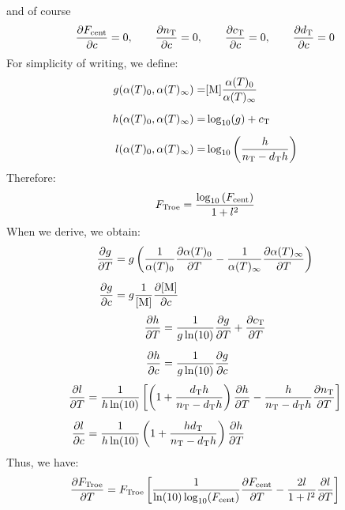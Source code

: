 and of course
\begin{equation}
\doverdc{\TroeFcent}  = 0,\qquad
\doverdc{\Troen}      = 0,\qquad
\doverdc{\Troec}      = 0,\qquad
\doverdc{\Troed}      = 0
\label{Troe:dparameterdc}
\end{equation}
For simplicity of writing, we define:
\begin{equation}
\begin{split}
g(\kinMod_0,\kinMod_\infty) = & \conc[M] \frac{\kinMod_0}{\kinMod_\infty} \\[5pt]
h(\kinMod_0,\kinMod_\infty) = & \log_{10}(g) + \Troec \\[5pt]
l(\kinMod_0,\kinMod_\infty) = & \log_{10}\left(\frac{h}{\Troen - \Troed h}\right) \\
\end{split}
\end{equation}
Therefore:
\begin{equation}
F_\text{Troe} = \frac{\log_{10}\left(F_\text{cent}\right)}{1 + l^2}
\end{equation}
When we derive, we obtain:
\begin{equation}
\begin{split}
\doverdT{g} & = g \left(\frac{1}{\kinMod_0}\doverdT{\kinMod_0} - \frac{1}{\kinMod_\infty}\doverdT{\kinMod_\infty} \right) \\[5pt]
\doverdc{g} & = g \frac{1}{\conc[M]}\doverdc{\conc[M]}
\end{split}
\end{equation}
\begin{equation}
\begin{split}
\doverdT{h} & = \frac{1}{g \ln(10)}\doverdT{g} + \doverdT{\Troec} \\[5pt]
\doverdc{h} & = \frac{1}{g\ln(10)}\doverdc{g}
\end{split}
\end{equation}
\begin{equation}
\begin{split}
\doverdT{l} & = \frac{1}{h \ln(10)}\left[\left(1 + \frac{\Troed h}{\Troen - \Troed h}\right) \doverdT{h} - \frac{h}{\Troen - \Troed h}\doverdT{\Troen} \right]  \\[5pt]
\doverdc{l} & = \frac{1}{h \ln(10)}\left(1 + \frac{h\Troed}{\Troen - \Troed h} \right)\doverdT{h}
\end{split}
\end{equation}
Thus, we have:
\begin{equation}
\doverdT{\FTroe} = \FTroe \left[
                                  \frac{1}{\ln(10)\log_{10}(\TroeFcent)}\doverdT{\TroeFcent}
                                - \frac{2 l}{1 + l^2} \doverdT{l}
                          \right]
\end{equation}

